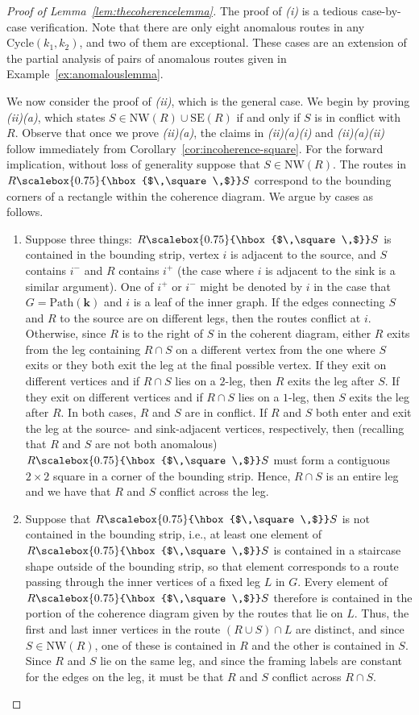 \documentclass[12pt]{amsart}
\theoremstyle{definition}
\newcommand\bk{\mathbf{k}}
\newcommand\Path{\mathrm{Path}}
\newcommand\Cycle{\mathrm{Cycle}}
\newcommand\NW{\mathrm{NW}}
\newcommand\SE{\mathrm{SE}}
\newcommand\squarette{\scalebox{0.75}{\hbox{$\,\square\,$}}}
\begin{document}
\begin{proof}[Proof of Lemma~\ref{lem:thecoherencelemma}]

The proof of \textit{(i)} is a tedious case-by-case verification.
Note that there are only eight anomalous routes in any $\Cycle(k_1,k_2)$, and two of them are exceptional.
These cases are an extension of the partial analysis of pairs of anomalous routes given in Example~\ref{ex:anomalouslemma}.

We now consider the proof of \textit{(ii)}, which is the general case.
We begin by proving \textit{(ii)(a)}, which states $S\in \NW(R) \cup \SE(R)$ if and only if $S$ is in conflict with $R$.
Observe that once we prove \textit{(ii)(a)}, the claims in \textit{(ii)(a)(i)} and \textit{(ii)(a)(ii)} follow immediately from Corollary~\ref{cor:incoherence-square}.
For the forward implication, without loss of generality suppose that $S\in \NW(R)$.
The routes in $R\squarette  S$ correspond to the bounding corners of a rectangle within the coherence diagram.
We argue by cases as follows.
\begin{enumerate}
    \item Suppose three things: $R\squarette S$ is contained in the bounding strip, vertex $i$ is adjacent to the source, and $S$ contains $i^-$ and $R$ contains $i^+$ (the case where $i$ is adjacent to the sink is a similar argument).
    One of $i^+$ or $i^-$ might be denoted by $i$ in the case that $G=\Path(\bk)$ and $i$ is a leaf of the inner graph. 
    If the edges connecting $S$ and $R$ to the source are on different legs, then the routes conflict at $i$.
    Otherwise, since $R$ is to the right of $S$ in the coherent diagram, either $R$ exits from the leg containing $R\cap S$ on a different vertex from the one where $S$ exits or they both exit the leg at the final possible vertex.
    If they exit on different vertices and if $R\cap S$ lies on a $2$-leg, then $R$ exits the leg after $S$.
    If they exit on different vertices and if $R\cap S$ lies on a $1$-leg, then $S$ exits the leg after $R$.
    In both cases, $R$ and $S$ are in conflict.
    If $R$ and $S$ both enter and exit the leg at the source- and sink-adjacent vertices, respectively, then (recalling that $R$ and $S$ are not both anomalous) $R\squarette S$ must form a contiguous $2\times 2$ square in a corner of the bounding strip.
    Hence, $R\cap S$ is an entire leg and we have that $R$ and $S$ conflict across the leg.
    \item Suppose that $R\squarette S$ is not contained in the bounding strip, i.e., at least one element of $R\squarette S$ is contained in a staircase shape outside of the bounding strip, so that element corresponds to a route passing through the inner vertices of a fixed leg $L$ in $G$.
    Every element of $R\squarette S$ therefore is contained in the portion of the coherence diagram given by the routes that lie on $L$.
    Thus, the first and last inner vertices in the route $(R\cup S)\cap L$ are distinct, and since $S\in \NW(R)$, one of these is contained in $R$ and the other is contained in $S$.
    Since $R$ and $S$ lie on the same leg, and since the framing labels are constant for the edges on the leg, it must be that $R$ and $S$ conflict across $R\cap S$.
\end{enumerate}


\end{proof}
\end{document}
